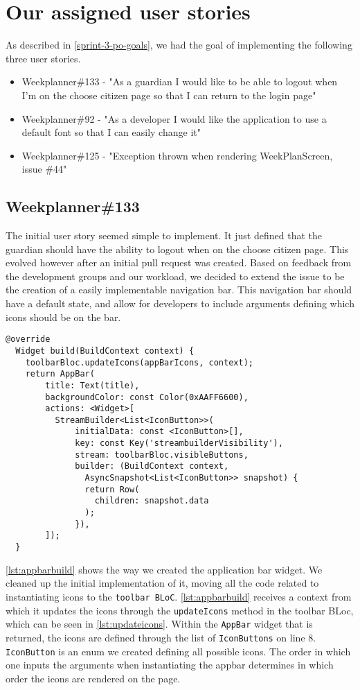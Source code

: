 \section{Our assigned user stories}
As described in \autoref{sprint-3-po-goals}, we had the goal of implementing the following three user stories.
\begin{itemize}\label{item:our-stories-sprint-3}
    \item Weekplanner\#133 - "As a guardian I would like to be able to logout when I'm on the choose citizen page so that I can return to the login page"
    \item Weekplanner\#92 - "As a developer I would like the application to use a default font so that I can easily change it"
    \item Weekplanner\#125 - "Exception thrown when rendering WeekPlanScreen, issue \#44"
\end{itemize}

\subsection{Weekplanner\#133}
The initial user story seemed simple to implement.
It just defined that the guardian should have the ability to logout when on the choose citizen page.
This evolved however after an initial pull request was created.
Based on feedback from the development groups and our workload, we decided to extend the issue to be the creation of a easily implementable navigation bar.
This navigation bar should have a default state, and allow for developers to include arguments defining which icons should be on the bar.

\begin{lstlisting}[caption={Building the appbar},label={lst:appbarbuild}]
  @override
  Widget build(BuildContext context) {
    toolbarBloc.updateIcons(appBarIcons, context);
    return AppBar(
        title: Text(title),
        backgroundColor: const Color(0xAAFF6600),
        actions: <Widget>[
          StreamBuilder<List<IconButton>>(
              initialData: const <IconButton>[],
              key: const Key('streambuilderVisibility'),
              stream: toolbarBloc.visibleButtons,
              builder: (BuildContext context, 
                AsyncSnapshot<List<IconButton>> snapshot) {
                return Row(
                  children: snapshot.data
                );
              }),
        ]);
  }
\end{lstlisting}
\autoref{lst:appbarbuild} shows the way we created the application bar widget.
We cleaned up the initial implementation of it, moving all the code related to instantiating icons to the \texttt{toolbar BLoC}.
\autoref{lst:appbarbuild} receives a context from which it updates the icons through the \texttt{updateIcons} method in the toolbar BLoc, which can be seen in \autoref{lst:updateicons}.
Within the \texttt{AppBar} widget that is returned, the icons are defined through the list of \texttt{IconButtons} on line 8.
\texttt{IconButton} is an enum we created defining all possible icons.
The order in which one inputs the arguments when instantiating the appbar determines in which order the icons are rendered on the page. 

